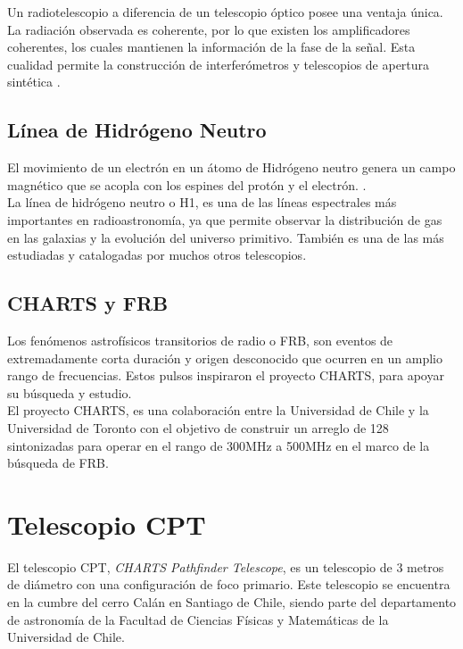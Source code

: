 Un radiotelescopio a diferencia de un telescopio óptico posee una ventaja única. La radiación observada es coherente, por lo que existen los amplificadores coherentes, los cuales mantienen la información de la fase de la señal. Esta cualidad permite la construcción de interferómetros y telescopios de apertura sintética \cite{Ransom2016}.\\ 

\subsection{Línea de Hidrógeno Neutro}

El movimiento de un electrón en un átomo de Hidrógeno neutro genera un campo magnético que se acopla con los espines del protón y el electrón.  \cite{Restrepo2023}.\\

La línea de hidrógeno neutro o H1, es una de las líneas espectrales más importantes en radioastronomía, ya que permite observar la distribución de gas en las galaxias y la evolución del universo primitivo. También es una de las más estudiadas y catalogadas por muchos otros telescopios.\\

\subsection{CHARTS y FRB}

Los fenómenos astrofísicos transitorios de radio o FRB, son eventos de extremadamente corta duración y origen desconocido que ocurren en un amplio rango de frecuencias. Estos pulsos inspiraron el proyecto CHARTS, para apoyar su búsqueda y estudio.\\

El proyecto CHARTS, es una colaboración entre la Universidad de Chile y la Universidad de Toronto con el objetivo de construir un arreglo de 128 sintonizadas para operar en el rango de 300MHz a 500MHz en el marco de la búsqueda de FRB.\\


\section{Telescopio CPT}

El telescopio CPT, \textit{CHARTS Pathfinder Telescope}, es un telescopio de 3 metros de diámetro con una configuración de foco primario. Este telescopio se encuentra en la cumbre del cerro Calán en Santiago de Chile, siendo parte del departamento de astronomía de la Facultad de Ciencias Físicas y Matemáticas de la Universidad de Chile.\\

